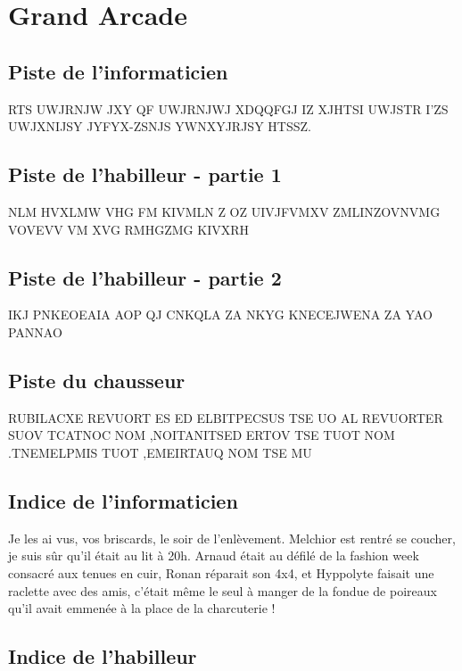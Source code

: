 \documentclass[12pt]{article}
\begin{document}
\section{Grand Arcade}


\subsection{Piste de l'informaticien}

RTS UWJRNJW JXY QF UWJRNJWJ XDQQFGJ IZ XJHTSI UWJSTR I'ZS UWJXNIJSY JYFYX-ZSNJS YWNXYJRJSY HTSSZ.


\subsection{Piste de l'habilleur - partie 1}

NLM HVXLMW VHG FM KIVMLN Z OZ UIVJFVMXV ZMLINZOVNVMG VOVEVV VM XVG RMHGZMG KIVXRH

\subsection{Piste de l'habilleur - partie 2}

IKJ PNKEOEAIA AOP QJ CNKQLA ZA NKYG KNECEJWENA ZA YAO PANNAO

\subsection{Piste du chausseur}

RUBILACXE REVUORT ES ED ELBITPECSUS TSE UO AL REVUORTER SUOV TCATNOC NOM ,NOITANITSED ERTOV TSE TUOT NOM .TNEMELPMIS TUOT ,EMEIRTAUQ NOM TSE MU



\subsection{Indice de l'informaticien}

Je les ai vus, vos briscards, le soir de l'enlèvement. Melchior est rentré se coucher, je suis sûr qu'il était au lit à 20h. Arnaud était au défilé de la fashion week consacré aux tenues en cuir, Ronan réparait son 4x4, et Hyppolyte faisait une raclette avec des amis, c'était même le seul à manger de la fondue de poireaux qu'il avait emmenée à la place de la charcuterie ! 

\subsection{Indice de l'habilleur}
\end{document}
